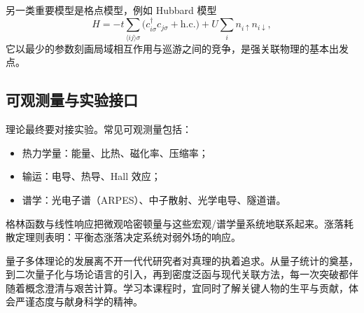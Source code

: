 另一类重要模型是格点模型，例如 Hubbard 模型
\begin{equation}
  H=-t\sum_{\langle ij\rangle\sigma}
  \bigl(c_{i\sigma}^\dagger c_{j\sigma}+\mathrm{h.c.}\bigr)
  +U\sum_i n_{i\uparrow}n_{i\downarrow},
\end{equation}
它以最少的参数刻画局域相互作用与巡游之间的竞争，是强关联物理的基本出发点。

\subsection{可观测量与实验接口}

理论最终要对接实验。常见可观测量包括：
\begin{itemize}
  \item 热力学量：能量、比热、磁化率、压缩率；
  \item 输运：电导、热导、Hall 效应；
  \item 谱学：光电子谱（ARPES）、中子散射、光学电导、隧道谱。
\end{itemize}
格林函数与线性响应把微观哈密顿量与这些宏观/谱学量系统地联系起来。涨落耗散定理则表明：平衡态涨落决定系统对弱外场的响应。

\begin{note}
量子多体理论的发展离不开一代代研究者对真理的执着追求。从量子统计的奠基，到二次量子化与场论语言的引入，再到密度泛函与现代关联方法，每一次突破都伴随着概念澄清与艰苦计算。学习本课程时，宜同时了解关键人物的生平与贡献，体会严谨态度与献身科学的精神。
\end{note}
